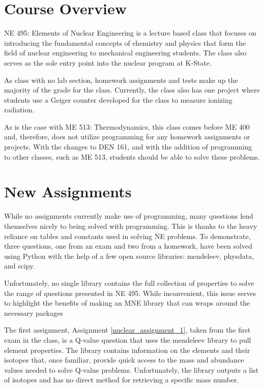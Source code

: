 \section{Course Overview}

NE 495: Elements of Nuclear Engineering is a lecture based class that focuses on introducing
the fundamental concepts of chemistry and physics that form the field of nuclear engineering 
to mechanical engineering students. The class also serves as the sole entry point into the nuclear
program at K-State. 

As class with no lab section, homework assignments and tests make up the majority of the grade
for the class. Currently, the class also has one project where students use a Geiger counter 
developed for the class to measure ionizing radiation. 

As is the case with ME 513: Thermodynamics, this class comes before ME 400 and, therefore, does
not utilize programming for any homework assignments or projects. With the changes to DEN 161,
and with the addition of programming to other classes, such as ME 513, students should be able 
to solve these problems.

\section{New Assignments}

While no assignments currently make use of programming, many questions lend themselves nicely
to being solved with programming. This is thanks to the heavy reliance on tables and
constants used in solving NE problems. To demonstrate, three questions, one from an exam
and two from a homework, have been solved using Python with the help of a few open source
libraries: mendeleev, physdata, and scipy.

Unfortunately, no single library contains the full collection of properties to solve the range
of questions presented in NE 495. While inconvenient, this issue serves to highlight the
benefits of making an MNE library that can wraps around the necessary packages

The first assignment, Assignment \ref{nuclear_assignment_1}, taken from the first exam in the class, 
is a Q-value question that uses 
the mendeleev library to pull element properties. The library contains information on the elements
and their isotopes that, once familiar, provide quick access to the mass and abundance values
needed to solve Q-value problems. Unfortunately, the library outputs a list of isotopes and 
has no direct method for retrieving a specific mass number.

